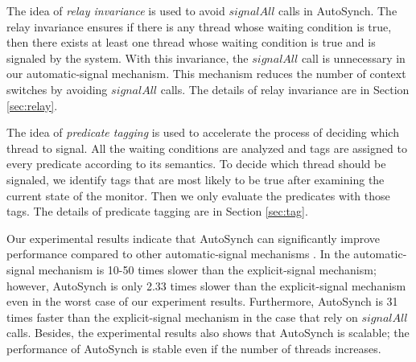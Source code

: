 \documentclass[preprint]{sigplanconf}
\begin{document}
The idea of {\em relay invariance} is used to avoid $signalAll$ calls in AutoSynch.
The relay invariance ensures if there is any thread whose waiting condition is true, then
there exists at least one thread whose waiting condition is  true and is signaled by the system.
With this invariance, the $signalAll$ call 
is unnecessary in our automatic-signal mechanism. This mechanism reduces 
the number of context switches by avoiding $signalAll$ calls. 
The details of relay invariance are in Section \ref{sec:relay}.


The idea of {\em predicate tagging} is used to accelerate the process of deciding which thread to signal.
All the waiting conditions are analyzed and tags are assigned to every predicate
according to its semantics. To decide which thread should be 
signaled, we identify tags that are most likely to be true after examining the 
current state of the monitor. Then we only evaluate the predicates with 
those tags. 
The details of predicate tagging are in Section \ref{sec:tag}.

Our experimental results indicate that AutoSynch can significantly improve
performance compared to other automatic-signal mechanisms \cite{bh05}. In \cite{bfc95,bh05}
the automatic-signal mechanism is 10-50 times
slower than the explicit-signal mechanism; however, AutoSynch is 
only 2.33 times slower than the explicit-signal mechanism even in the worst 
case of our experiment results. Furthermore, AutoSynch is 31
times faster than the explicit-signal mechanism in the case that rely on 
$signalAll$ calls. Besides, the experimental results also shows that AutoSynch 
is scalable; the performance of AutoSynch is stable even if the number of 
threads increases. 
\end{document}
